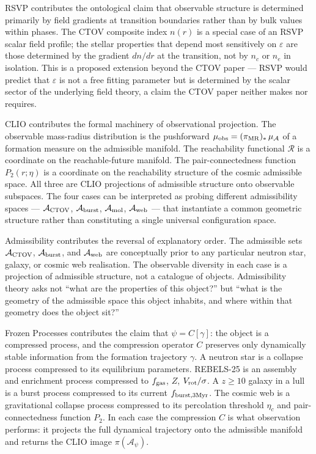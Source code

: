 \documentclass[12pt, oneside]{article}
\begin{document}
RSVP contributes the ontological claim that observable structure is determined primarily by field gradients at transition boundaries rather than by bulk values within phases. The CTOV composite index $n(r)$ is a special case of an RSVP scalar field profile; the stellar properties that depend most sensitively on $\varepsilon$ are those determined by the gradient $dn/dr$ at the transition, not by $n_c$ or $n_e$ in isolation. This is a proposed extension beyond the CTOV paper --- RSVP would predict that $\varepsilon$ is not a free fitting parameter but is determined by the scalar sector of the underlying field theory, a claim the CTOV paper neither makes nor requires.

CLIO contributes the formal machinery of observational projection. The observable mass-radius distribution is the pushforward $\mu_{\rm obs} = (\pi_{\rm MR})_*\,\mu_{\mathcal{A}}$ of a formation measure on the admissible manifold. The reachability functional $\mathcal{R}$ is a coordinate on the reachable-future manifold. The pair-connectedness function $P_2(r;\eta)$ is a coordinate on the reachability structure of the cosmic admissible space. All three are CLIO projections of admissible structure onto observable subspaces. The four cases can be interpreted as probing different admissibility spaces --- $\mathcal{A}_{\rm CTOV}$, $\mathcal{A}_{\rm burst}$, $\mathcal{A}_{\rm mol}$, $\mathcal{A}_{\rm web}$ --- that instantiate a common geometric structure rather than constituting a single universal configuration space.

Admissibility contributes the reversal of explanatory order. The admissible sets $\mathcal{A}_{\rm CTOV}$, $\mathcal{A}_{\rm burst}$, and $\mathcal{A}_{\rm web}$ are conceptually prior to any particular neutron star, galaxy, or cosmic web realisation. The observable diversity in each case is a projection of admissible structure, not a catalogue of objects. Admissibility theory asks not ``what are the properties of this object?'' but ``what is the geometry of the admissible space this object inhabits, and where within that geometry does the object sit?''

Frozen Processes contributes the claim that $\psi = C[\gamma]$: the object is a compressed process, and the compression operator $C$ preserves only dynamically stable information from the formation trajectory $\gamma$. A neutron star is a collapse process compressed to its equilibrium parameters. REBELS-25 is an assembly and enrichment process compressed to $f_{\rm gas}$, $Z$, $V_{\rm rot}/\sigma$. A $z \geq 10$ galaxy in a lull is a burst process compressed to its current $f_{\rm burst,3Myr}$. The cosmic web is a gravitational collapse process compressed to its percolation threshold $\eta_c$ and pair-connectedness function $P_2$. In each case the compression $C$ is what observation performs: it projects the full dynamical trajectory onto the admissible manifold and returns the CLIO image $\pi(\mathcal{A}_\psi)$.
\end{document}
